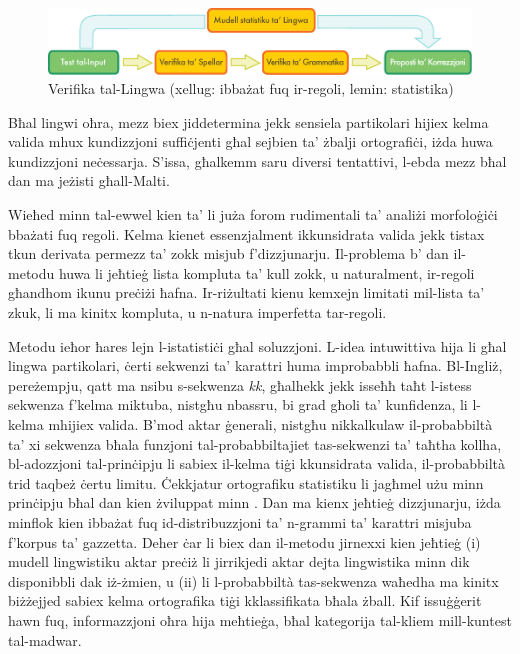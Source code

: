 \documentclass[]{../../metanetpaper}
\begin{document}
\begin{multicols}{2}
\begin{figure}[htb]
  \center
  \includegraphics[width=\textwidth]{../_media/maltese/language_checking}
  \caption{Verifika tal-Lingwa (xellug: ibbażat fuq ir-regoli, lemin: statistika)}
  \label{fig:langcheckingaarch_mt}
\end{figure}

Bħal lingwi oħra, mezz biex jiddetermina jekk sensiela partikolari hijiex kelma valida mhux kundizzjoni suffiċjenti għal sejbien ta’ żbalji ortografiċi, iżda huwa kundizzjoni neċessarja. S’issa, għalkemm saru diversi tentattivi, l-ebda mezz bħal dan ma jeżisti għall-Malti.

Wieħed minn tal-ewwel kien ta’ \cite{Mangion:1999} li juża forom rudimentali ta’ analiżi morfoloġiċi bbażati fuq regoli. Kelma kienet essenzjalment ikkunsidrata valida jekk tistax tkun derivata permezz ta' zokk misjub f’dizzjunarju. Il-problema b’ dan il-metodu huwa li jeħtieġ lista kompluta ta’ kull zokk, u naturalment, ir-regoli għandhom ikunu preċiżi ħafna. Ir-riżultati kienu kemxejn limitati mil-lista ta’ zkuk, li ma kinitx kompluta, u n-natura imperfetta tar-regoli.

Metodu ieħor ħares lejn l-istatistiċi għal soluzzjoni. L-idea intuwittiva hija li għal lingwa partikolari, ċerti sekwenzi ta’ karattri huma improbabbli ħafna. Bl-Ingliż, pereżempju, qatt ma nsibu s-sekwenza \emph{kk}, għalhekk jekk isseħħ taħt l-istess sekwenza f’kelma miktuba, nistgħu nbassru, bi grad għoli ta’ kunfidenza, li l-kelma mhijiex valida. B’mod aktar ġenerali, nistgħu nikkalkulaw il-probabbiltà ta’ xi sekwenza bħala funzjoni tal-probabbiltajiet tas-sekwenzi ta’ taħtha kollha, bl-adozzjoni tal-prinċipju li sabiex il-kelma tiġi kkunsidrata valida, il-probabbiltà trid taqbeż ċertu limitu. Ċekkjatur ortografiku statistiku li jagħmel użu minn prinċipju bħal dan kien żviluppat minn \cite{Mizzi:2000}. Dan ma kienx jeħtieġ dizzjunarju, iżda minflok kien ibbażat fuq id-distribuzzjoni ta’ n-grammi ta' karattri misjuba f’korpus ta’ gazzetta. Deher ċar li biex dan il-metodu jirnexxi kien jeħtieġ (i) mudell lingwistiku aktar preċiż li jirrikjedi aktar dejta lingwistika minn dik disponibbli dak iż-żmien, u (ii) li l-probabbiltà tas-sekwenza waħedha ma kinitx biżżejjed sabiex kelma ortografika tiġi kklassifikata bħala żball. Kif issuġġerit hawn fuq, informazzjoni oħra hija meħtieġa, bħal kategorija tal-kliem mill-kuntest tal-madwar.


\end{multicols}
\end{document}
